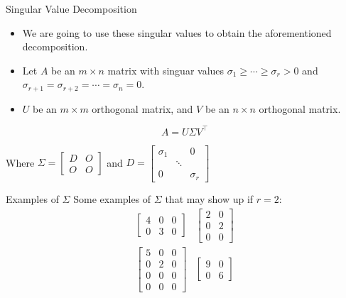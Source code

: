 \documentclass{beamer}
\begin{document}
	\begin{frame}{Singular Value Decomposition}
		\begin{itemize}
			\item We are going to use these singular values to obtain the aforementioned decomposition.\pause
			\item Let $A$ be an $m\times n$ matrix with singuar values $\sigma_1\geq\cdots\geq\sigma_r>0$ and $\sigma_{r+1}=\sigma_{r+2}=\cdots=\sigma_n=0$.
			\item $U$ be an $m\times m$ orthogonal matrix, and $V$ be an $n\times n$ orthogonal matrix.\pause
		\end{itemize}
		\pause
		\[A=U\Sigma V^{\intercal}\]
		\pause
		\begin{center}
			Where $\Sigma=\left[\begin{array}{c|c}D&O\\\hline O&O\end{array}\right]$ and $D=\left[\begin{array}{ccc}\sigma_1&&0\\&\ddots&\\0&&\sigma_r\end{array}\right]$
		\end{center}
	\end{frame}
	
	\begin{frame}{Examples of $\Sigma$}
		Some examples of $\Sigma$ that may show up if $r=2$:
		\[
		\begin{array}{cc}
			\left[\begin{array}{ccc}
			4&0&0\\0&3&0
			\end{array}\right]
			&
			\left[\begin{array}{cc}
			2&0\\0&2\\0&0
			\end{array}\right]\\
			\left[\begin{array}{ccc}
			5&0&0\\0&2&0\\0&0&0\\0&0&0
			\end{array}\right]
			&
			\left[\begin{array}{cc}
			9&0\\0&6
			\end{array}\right]
		\end{array}\]
	\end{frame}
	
\end{document}

